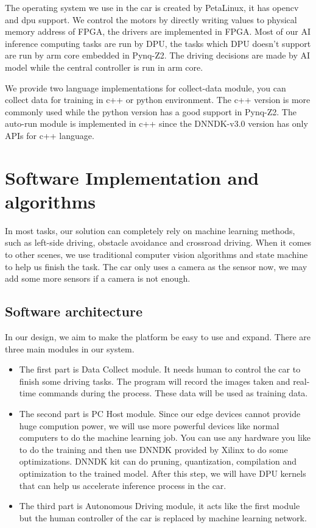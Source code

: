 \documentclass[conference]{IEEEtran}
\begin{document}
The operating system we use in the car is created by PetaLinux, it has opencv and dpu support. We control the motors by directly writing values to physical memory address of FPGA, the drivers are implemented in FPGA. Most of our AI inference computing tasks are run by DPU, the tasks which DPU doesn't support are run by arm core embedded in Pynq-Z2. The driving decisions are made by AI model while the central controller is run in arm core.  

We provide two language implementations for collect-data module, you can collect data for training in c++ or python environment. The c++ version is more commonly used while the python version has a good support in Pynq-Z2. The auto-run module is implemented in c++ since the DNNDK-v3.0 version has only APIs for c++ language.

\section{Software Implementation and algorithms}

In most tasks, our solution can completely rely on machine learning methods, such as left-side driving, obstacle avoidance and crossroad driving. When it comes to other scenes, we use traditional computer vision algorithms and state machine to help us finish the task. The car only uses a camera as the sensor now, we may add some more sensors if a camera is not enough.

\subsection{Software architecture}\label{AA}

In our design, we aim to make the platform be easy to use and expand. There are three main modules in our system.

\begin{itemize}
\item The first part is Data Collect module. It needs human to control the car to finish some driving tasks. The program will record the images taken and real-time commands during the process. These data will be used as training data.
\item The second part is PC Host module. Since our edge devices cannot provide huge compution power, we will use more powerful devices like normal computers to do the machine learning job. You can use any hardware you like to do the training and then use DNNDK provided by Xilinx to do some optimizations. DNNDK kit can do pruning, quantization, compilation and optimization to the trained model. After this step, we will have DPU kernels that can help us accelerate inference process in the car.
\item The third part is Autonomous Driving module, it acts like the first module but the human controller of the car is replaced by machine learning network.
\end{itemize}
\end{document}
